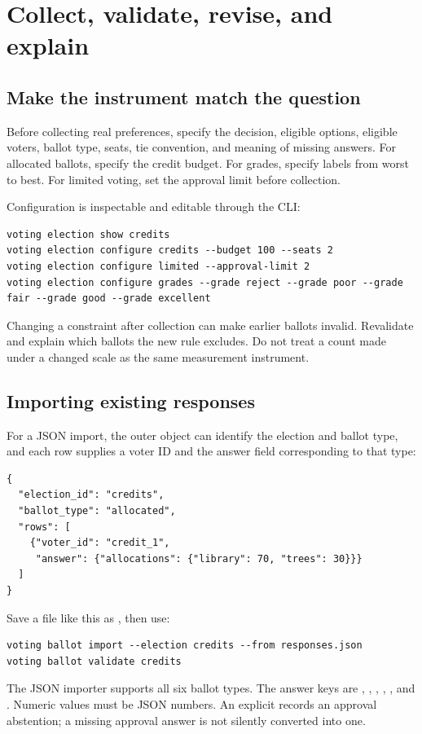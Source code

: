 \chapter{Collect, validate, revise, and explain}
\label{chap:practice}
\section{Make the instrument match the question}
Before collecting real preferences, specify the decision, eligible options, eligible voters, ballot type, seats, tie convention, and meaning of missing answers. For allocated ballots, specify the credit budget. For grades, specify labels from worst to best. For limited voting, set the approval limit before collection.

Configuration is inspectable and editable through the CLI:
\begin{lstlisting}
voting election show credits
voting election configure credits --budget 100 --seats 2
voting election configure limited --approval-limit 2
voting election configure grades --grade reject --grade poor --grade fair --grade good --grade excellent
\end{lstlisting}
Changing a constraint after collection can make earlier ballots invalid. Revalidate and explain which ballots the new rule excludes. Do not treat a count made under a changed scale as the same measurement instrument.

\section{Importing existing responses}
For a JSON import, the outer object can identify the election and ballot type, and each row supplies a voter ID and the answer field corresponding to that type:
\begin{lstlisting}[language={}]
{
  "election_id": "credits",
  "ballot_type": "allocated",
  "rows": [
    {"voter_id": "credit_1",
     "answer": {"allocations": {"library": 70, "trees": 30}}}
  ]
}
\end{lstlisting}
Save a file like this as , then use:
\begin{lstlisting}
voting ballot import --election credits --from responses.json
voting ballot validate credits
\end{lstlisting}
The JSON importer supports all six ballot types. The answer keys are , , , , , and . Numeric values must be JSON numbers. An explicit  records an approval abstention; a missing approval answer is not silently converted into one.

